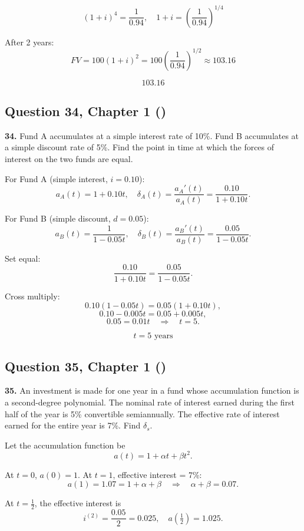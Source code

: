 \documentclass[12pt, a4paper]{article}
\begin{document}
\[
(1+i)^4 = \frac{1}{0.94}, 
\quad 1+i = \left(\frac{1}{0.94}\right)^{1/4}
\]

After 2 years:
\[
FV = 100 (1+i)^2 = 100 \left(\frac{1}{0.94}\right)^{1/2} \approx 103.16
\]

\[
\boxed{103.16}
\]

\subsection*{Question 34, Chapter 1  (\cite{toi3rd})}

\textbf{34.} Fund A accumulates at a simple interest rate of 10\%.  
Fund B accumulates at a simple discount rate of 5\%.  
Find the point in time at which the forces of interest on the two funds are equal.

\bigskip
For Fund A (simple interest, \(i = 0.10\)):  
\[
a_A(t) = 1 + 0.10t, 
\quad \delta_A(t) = \frac{a_A'(t)}{a_A(t)} 
= \frac{0.10}{1+0.10t}.
\]

For Fund B (simple discount, \(d = 0.05\)):  
\[
a_B(t) = \frac{1}{1-0.05t}, 
\quad \delta_B(t) = \frac{a_B'(t)}{a_B(t)} 
= \frac{0.05}{1-0.05t}.
\]

Set equal:
\[
\frac{0.10}{1+0.10t} = \frac{0.05}{1-0.05t}.
\]

Cross multiply:
\[
0.10(1-0.05t) = 0.05(1+0.10t),
\]
\[
0.10 - 0.005t = 0.05 + 0.005t,
\]
\[
0.05 = 0.01t \quad \Rightarrow \quad t = 5.
\]

\[
\boxed{t = 5 \text{ years}}
\]

\subsection*{Question 35, Chapter 1  (\cite{toi3rd})}

\textbf{35.} An investment is made for one year in a fund whose accumulation function 
is a second-degree polynomial. The nominal rate of interest earned during the first half 
of the year is 5\% convertible semiannually. The effective rate of interest earned for the entire year is 7\%. Find \(\delta_s\).

\bigskip
Let the accumulation function be
\[
a(t) = 1 + \alpha t + \beta t^2.
\]

At \(t=0\), \(a(0)=1\).  
At \(t=1\), effective interest = 7\%:
\[
a(1) = 1.07 = 1 + \alpha + \beta \quad \Rightarrow \quad \alpha + \beta = 0.07.
\]

At \(t=\tfrac{1}{2}\), the effective interest is 
\[
i^{(2)} = \frac{0.05}{2} = 0.025,
\quad a\!\left(\tfrac{1}{2}\right) = 1.025.
\]
\end{document}
